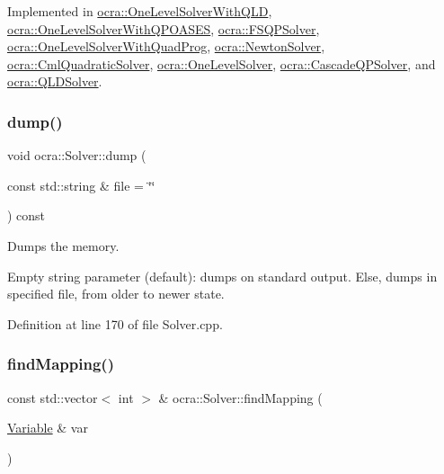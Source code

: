 Implemented in \hyperlink{classocra_1_1OneLevelSolverWithQLD_ac7cce5bd375142ca0c74cd71300b15a5}{ocra\+::\+One\+Level\+Solver\+With\+Q\+LD}, \hyperlink{classocra_1_1OneLevelSolverWithQPOASES_aa2d1343a6e0f5c8913496c3384c0cd40}{ocra\+::\+One\+Level\+Solver\+With\+Q\+P\+O\+A\+S\+ES}, \hyperlink{classocra_1_1FSQPSolver_a72c34e448c726e68ce441b634150b115}{ocra\+::\+F\+S\+Q\+P\+Solver}, \hyperlink{classocra_1_1OneLevelSolverWithQuadProg_aa6e7517459ef68106e83a7f0dc09c977}{ocra\+::\+One\+Level\+Solver\+With\+Quad\+Prog}, \hyperlink{classocra_1_1NewtonSolver_ac49e1e33eb86cb15ac505e638c2fccb9}{ocra\+::\+Newton\+Solver}, \hyperlink{classocra_1_1CmlQuadraticSolver_aac5943e307225837253c470a931640ec}{ocra\+::\+Cml\+Quadratic\+Solver}, \hyperlink{classocra_1_1OneLevelSolver_aeb4fb349df382921c5c0064d7a05c48b}{ocra\+::\+One\+Level\+Solver}, \hyperlink{classocra_1_1CascadeQPSolver_aea57e3bc9dabe277161d742af5cd88dc}{ocra\+::\+Cascade\+Q\+P\+Solver}, and \hyperlink{classocra_1_1QLDSolver_acf5bca219fc8a5be246589f76097a6e0}{ocra\+::\+Q\+L\+D\+Solver}.

\hypertarget{classocra_1_1Solver_ad81e89280ad6157a8c2bdc715fc8c8b4}{}\label{classocra_1_1Solver_ad81e89280ad6157a8c2bdc715fc8c8b4} 
\subsubsection{\texorpdfstring{dump()}{dump()}}
{\footnotesize\ttfamily void ocra\+::\+Solver\+::dump (\begin{DoxyParamCaption}\item[{const std\+::string \&}]{file = {\ttfamily \char`\"{}\char`\"{}} }\end{DoxyParamCaption}) const}

Dumps the memory.

Empty string parameter (default)\+: dumps on standard output. Else, dumps in specified file, from older to newer state. 

Definition at line 170 of file Solver.\+cpp.

\hypertarget{classocra_1_1Solver_a67ee15c2dd55a5345f3872b35fca59cd}{}\label{classocra_1_1Solver_a67ee15c2dd55a5345f3872b35fca59cd} 
\subsubsection{\texorpdfstring{find\+Mapping()}{findMapping()}}
{\footnotesize\ttfamily const std\+::vector$<$ int $>$ \& ocra\+::\+Solver\+::find\+Mapping (\begin{DoxyParamCaption}\item[{\hyperlink{classocra_1_1Variable}{Variable} \&}]{var }\end{DoxyParamCaption})}



